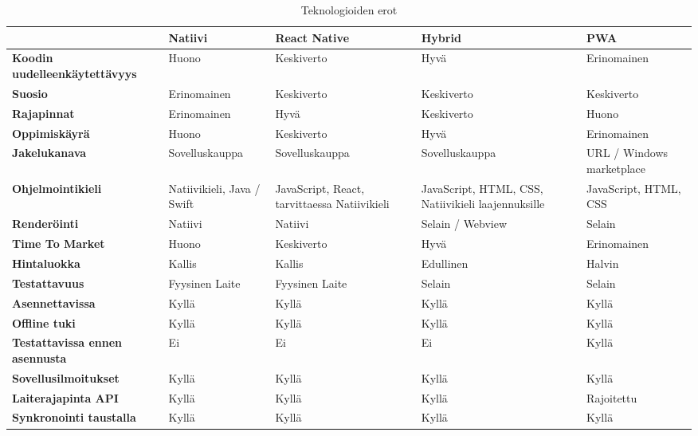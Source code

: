 \documentclass{tktltiki}
\begin{document}
\begin{landscape}
\begin{table}[h]
\centering
\begin{small}
\begin{tabular}{|L{4cm}|L{4cm}|L{4cm}|L{4cm}| L{4cm}|}
\hline
\textbf{} &
\textbf{Natiivi} & 
\textbf{React Native} &
\textbf{Hybrid} & 
\textbf{PWA}
\\ \hline
\textbf{Koodin uudelleenkäytettävyys} & Huono &	Keskiverto & Hyvä & Erinomainen
\\ \hline
\textbf{Suosio} & Erinomainen & Keskiverto & Keskiverto & Keskiverto
\\ \hline
\textbf{Rajapinnat} & Erinomainen &	Hyvä & Keskiverto &	Huono
\\ \hline
\textbf{Oppimiskäyrä} & Huono &	Keskiverto & Hyvä &	Erinomainen
\\ \hline
\textbf{Jakelukanava} & Sovelluskauppa & Sovelluskauppa & Sovelluskauppa & URL / Windows marketplace
\\ \hline
\textbf{Ohjelmointikieli} & Natiivikieli, Java / Swift & JavaScript, React, tarvittaessa Natiivikieli &	JavaScript, HTML, CSS, Natiivikieli laajennuksille & JavaScript, HTML, CSS
\\ \hline
\textbf{Renderöinti} & Natiivi & Natiivi & Selain / Webview & Selain
\\ \hline
\textbf{Time To Market} & Huono	& Keskiverto & Hyvä & Erinomainen
\\ \hline
\textbf{Hintaluokka} & Kallis &	Kallis & Edullinen & Halvin
\\ \hline
\textbf{Testattavuus} & Fyysinen Laite & Fyysinen Laite & Selain & Selain
\\ \hline
\textbf{Asennettavissa} & Kyllä & Kyllä & Kyllä & Kyllä
\\ \hline
\textbf{Offline tuki} & Kyllä & Kyllä & Kyllä & Kyllä
\\ \hline
\textbf{Testattavissa ennen asennusta} & Ei & Ei & Ei & Kyllä
\\ \hline
\textbf{Sovellusilmoitukset} & Kyllä & Kyllä & Kyllä & Kyllä
\\ \hline
\textbf{Laiterajapinta API} & Kyllä & Kyllä & Kyllä & Rajoitettu
\\ \hline
\textbf{Synkronointi taustalla} & Kyllä & Kyllä & Kyllä & Kyllä
\\ \hline
\end{tabular}
\caption{ Teknologioiden erot \cite{biorn2017progressive} }
\label{table:teknologiaerot}
\end{small}
\end{table}

\end{landscape}
\end{document}
